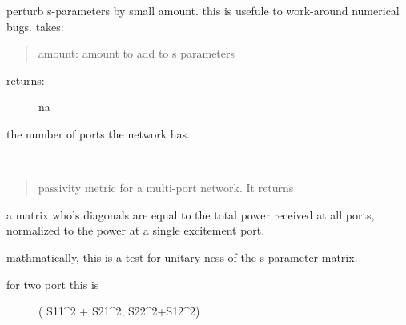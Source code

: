\documentclass[letterpaper,10pt,english]{sphinxmanual}
\begin{document}
\begin{fulllineitems}
\begin{fulllineitems}
\end{fulllineitems}


\begin{fulllineitems}
\label{api/mwavepy:mwavepy.network.Network.nudge}
perturb s-parameters by small amount. this is usefule to work-around
numerical bugs.
takes:
\begin{quote}

amount: amount to add to s parameters
\end{quote}
\begin{description}
\item[{returns:}] \leavevmode
na

\end{description}

\end{fulllineitems}


\begin{fulllineitems}
\label{api/mwavepy:mwavepy.network.Network.number_of_ports}
the number of ports the network has.

\end{fulllineitems}


\begin{fulllineitems}
\label{api/mwavepy:mwavepy.network.Network.passivity}~\begin{quote}

passivity metric for a multi-port network. It returns
\end{quote}

a matrix who's diagonals are equal to the total power 
received at all ports, normalized to the power at a single
excitement  port.

mathmatically, this is a test for unitary-ness of the 
s-parameter matrix.
\begin{description}
\item[{for two port this is }] \leavevmode
( {\color{red}\bfseries{}\textbar{}}S11\textbar{}\textasciicircum{}2 + {\color{red}\bfseries{}\textbar{}}S21\textbar{}\textasciicircum{}2, {\color{red}\bfseries{}\textbar{}}S22\textbar{}\textasciicircum{}2+\textbar{}S12\textbar{}\textasciicircum{}2)


\end{description}
\end{fulllineitems}
\end{fulllineitems}
\end{document}
